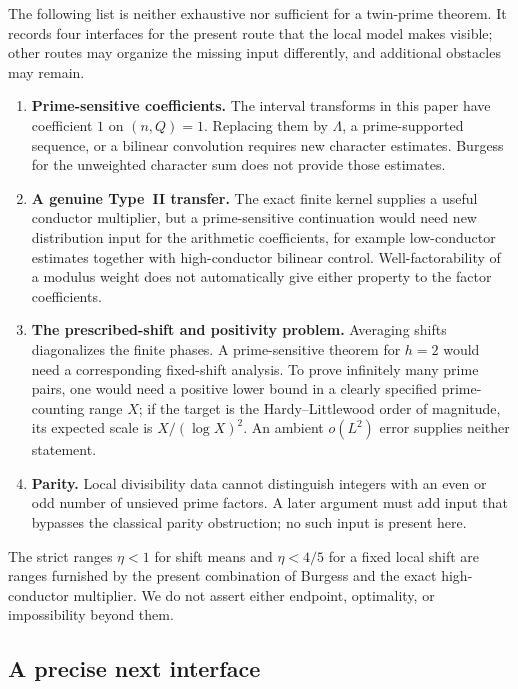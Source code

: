 The following list is neither exhaustive nor sufficient for a twin-prime theorem.  It records four interfaces for the present route that the local model makes visible; other routes may organize the missing input differently, and additional obstacles may remain.
\begin{enumerate}[label=\textbf{G\arabic*.},leftmargin=3.2em]
 \item \textbf{Prime-sensitive coefficients.}  The interval transforms in this paper have coefficient $1$ on $(n,Q)=1$.  Replacing them by $\Lambda$, a prime-supported sequence, or a bilinear convolution requires new character estimates.  Burgess for the unweighted character sum does not provide those estimates.
 \item \textbf{A genuine Type~II transfer.}  The exact finite kernel supplies a useful conductor multiplier, but a prime-sensitive continuation would need new distribution input for the arithmetic coefficients, for example low-conductor estimates together with high-conductor bilinear control.  Well-factorability of a modulus weight does not automatically give either property to the factor coefficients.
 \item \textbf{The prescribed-shift and positivity problem.}  Averaging shifts diagonalizes the finite phases.  A prime-sensitive theorem for $h=2$ would need a corresponding fixed-shift analysis.  To prove infinitely many prime pairs, one would need a positive lower bound in a clearly specified prime-counting range $X$; if the target is the Hardy--Littlewood order of magnitude, its expected scale is $X/(\log X)^2$.  An ambient $o(L^2)$ error supplies neither statement.
 \item \textbf{Parity.}  Local divisibility data cannot distinguish integers with an even or odd number of unsieved prime factors.  A later argument must add input that bypasses the classical parity obstruction; no such input is present here.
\end{enumerate}

\begin{remark}\label{rem:method-ranges-not-barriers}
The strict ranges $\eta<1$ for shift means and $\eta<4/5$ for a fixed local shift are ranges furnished by the present combination of Burgess and the exact high-conductor multiplier.  We do not assert either endpoint, optimality, or impossibility beyond them.
\end{remark}

\subsection{A precise next interface}

